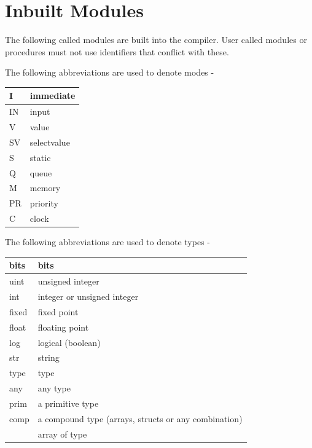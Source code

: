 \pagebreak

\chapter{Inbuilt Modules}

    The following called modules are built into the compiler. User
    called modules or procedures must not use identifiers that conflict
    with these.
    
    The following abbreviations are used to denote modes -

    \begin{tabular}{| l | l |}
    \hline
    I  & immediate      \\ \hline
    IN & input          \\ \hline
    V  & value          \\ \hline
    SV & selectvalue    \\ \hline
    S  & static         \\ \hline
    Q  & queue          \\ \hline
    M  & memory         \\ \hline
    PR & priority       \\ \hline
    C  & clock          \\ \hline
    \end{tabular}
    
    The following abbreviations are used to denote types -

    \begin{tabular}{| l | l |}
    \hline
    bits & bits                                                 \\ \hline
    uint & unsigned integer                                     \\ \hline
    int & integer or unsigned integer                           \\ \hline
    fixed & fixed point                                         \\ \hline
    float & floating point                                      \\ \hline
    log & logical (boolean)                                     \\ \hline
    str & string                                                \\ \hline
    type & type                                                 \\ \hline
    any & any type                                              \\ \hline
    prim & a primitive type                                     \\ \hline
    comp & a compound type (arrays, structs or any combination) \\ \hline
    [] & array of type                                          \\ \hline
    \end{tabular}


